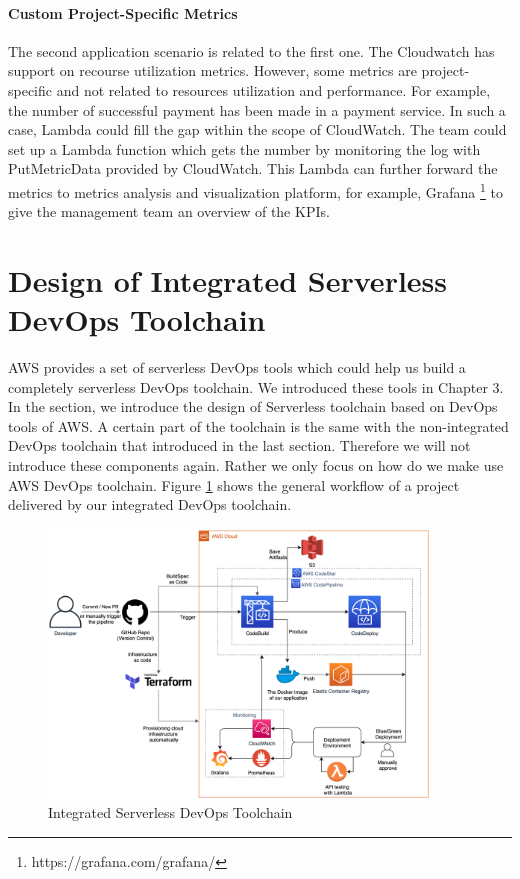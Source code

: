 \paragraph[]{Custom Project-Specific Metrics}
The second application scenario is related to the first one. The Cloudwatch has support on recourse utilization metrics. However, some metrics are project-specific and not related to resources utilization and performance. For example, the number of successful payment has been made in a payment service. In such a case, Lambda could fill the gap within the scope of CloudWatch. The team could set up a Lambda function which gets the number by monitoring the log with PutMetricData provided by CloudWatch. This Lambda can further forward the metrics to metrics analysis and visualization platform, for example, Grafana \footnote{https://grafana.com/grafana/} to give the management team an overview of the KPIs.
\section{Design of Integrated Serverless DevOps Toolchain}
AWS provides a set of serverless DevOps tools which could help us build a completely serverless DevOps toolchain. We introduced these tools in Chapter 3. In the section, we introduce the design of Serverless toolchain based on DevOps tools of AWS. A certain part of the toolchain is the same with the non-integrated DevOps toolchain that introduced in the last section. Therefore we will not introduce these components again. Rather we only focus on how do we make use AWS DevOps toolchain. Figure \ref{fig:codepipeline} shows the general workflow of a project delivered by our integrated DevOps toolchain.
\begin{figure}[h]
 \centering
 \includegraphics[width=0.90\textwidth]{pics/codepipeline.png}
 \caption{Integrated Serverless DevOps Toolchain}
 \label{fig:codepipeline}
\end{figure}
